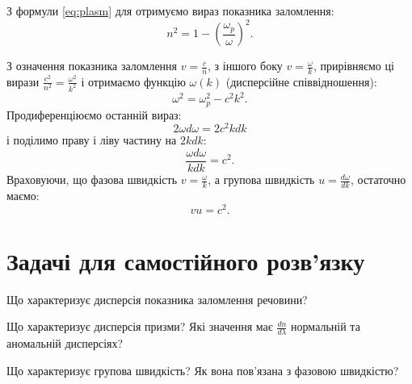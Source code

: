 \begin{solutionexample}[height fill=false]

	З формули \eqref{eq:plasm} для отримуємо вираз показника заломлення:
	\begin{equation*}
		n^2 = 1 - \left( \frac{\omega_p}{\omega}\right)^2.
	\end{equation*}

	З означення показника заломлення $v = \frac{c}{n}$, з іншого боку $v = \frac{\omega}{k}$, прирівняємо ці вирази $\frac{c^2}{n^2} = \frac{\omega^2}{k^2}$ і отримаємо функцію $\omega(k)$ (дисперсійне співвідношення):
	\begin{equation*}
		\omega^2 = \omega_p^2  - c^2k^2.
	\end{equation*}
	Продиференціюємо останній вираз:
	\begin{equation*}
		2\omega d\omega = 2c^2k dk
	\end{equation*}
	і поділимо праву і ліву частину на $2kdk$:
	\begin{equation*}
		\frac{\omega d\omega}{k dk} = c^2.
	\end{equation*}
	Враховуючи, що фазова швидкість $v = \frac{\omega}{k}$, а групова швидкість $u = \frac{d\omega}{dk}$, остаточно маємо:
	\begin{equation*}
		vu = c^2.
	\end{equation*}
\end{solutionexample}

\section{Задачі для самостійного розв’язку }

\begin{problem}%
Що характеризує дисперсія показника заломлення речовини?
\end{problem}

\begin{problem}%
Що характеризує дисперсія призми? Які значення має $\frac{dn}{d\lambda}$ нормальній та аномальній дисперсіях?
\end{problem}

\begin{problem}%
Що характеризує групова швидкість? Як вона пов’язана з фазовою
швидкістю?
\end{problem}

